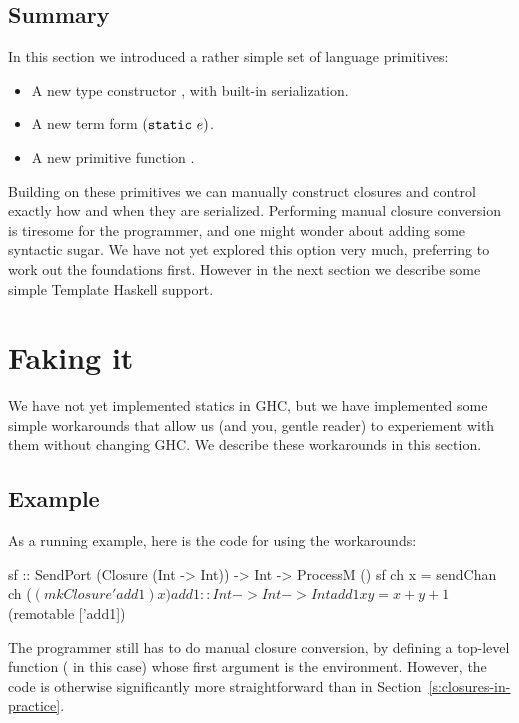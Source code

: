\documentclass[preprint]{sigplanconf}
\begin{document}
\subsection{Summary}

In this section we introduced a rather simple set of language primitives:
\begin{itemize}
\item A new type constructor , with built-in serialization.
\item A new term form $(\text{\tt static}~e)$.
\item A new primitive function .
\end{itemize}
Building on these primitives we can manually construct closures and
control exactly how and when they are serialized.
Performing manual closure conversion is tiresome for the programmer,
and one might wonder about adding some syntactic sugar.
We have not yet explored this option very much, preferring to work out the
foundations first.
However in the next section we describe some simple Template Haskell support.



\section{Faking it}

We have not yet implemented statics in GHC, but we have implemented
some simple workarounds that allow us (and you, gentle reader) to experiement
with them without changing GHC.  We describe these workarounds in this section.

\subsection{Example}
As a running example, here is the code for  using the workarounds:
\begin{code}
  sf :: SendPort (Closure (Int -> Int)) 
     -> Int -> ProcessM ()
  sf ch x = sendChan ch ($(mkClosure 'add1) x)

  add1 :: Int -> Int -> Int
  add1 x y = x + y + 1

  $(remotable ['add1])
\end{code}
The programmer still has to do manual closure conversion, by defining
a top-level function ( in this case) whose first argument is
the environment.  However, the code is otherwise significantly more 
straightforward than in Section~\ref{s:closures-in-practice}.
\end{document}
